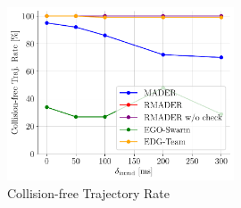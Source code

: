 
\begin{figure}
    \centering
    \includegraphics[width=0.6\textwidth]{figures/collision_free_traj.pdf}
    \caption{\centering Collision-free Trajectory Rate}
    \label{fig:sim_collision_free_traj_rate}
\end{figure}

